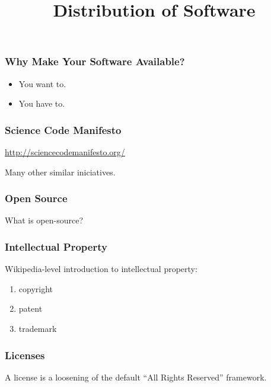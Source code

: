 
\title{Distribution of Software}

\frame{\maketitle}

\begin{frame}[fragile]
\frametitle{Why Make Your Software Available?}

\begin{itemize}
\item You \alert{want} to.
\item You \alert{have} to.
\end{itemize}
%
\end{frame}

\begin{frame}[fragile]
\frametitle{Science Code Manifesto}

\url{http://sciencecodemanifesto.org/}

\pause

\bigskip
\bigskip
Many other similar iniciatives.
%
\end{frame}


\begin{frame}[fragile]
\frametitle{Open Source}
What is open-source?
\end{frame}

\begin{frame}[fragile]
\frametitle{Intellectual Property}
Wikipedia-level introduction to intellectual property:
\begin{enumerate}
\item copyright
\item patent 
\item trademark
\end{enumerate}
\end{frame}

\begin{frame}[fragile]
\frametitle{Licenses}
A license is a \alert{loosening} of the default ``All Rights Reserved'' framework.
\end{frame}

